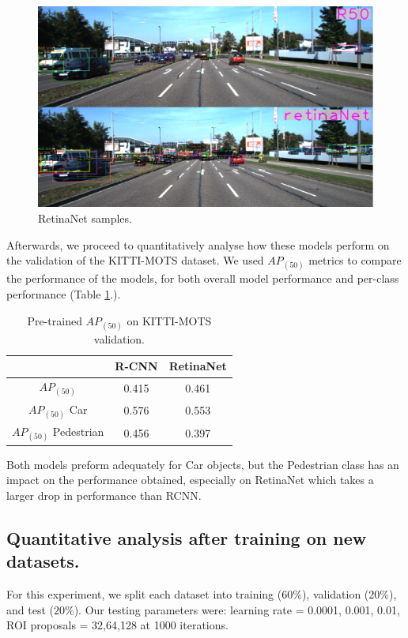 \documentclass[11pt,a4paper,twocolumn,twoside]{article}
\begin{document}
\begin{figure}[ht]
    \centering
    \includegraphics[width=0.8\linewidth]{Resources/Images/r50retina.png}
    \caption{RetinaNet samples.}
    \label{fig:r50retina}
    \end{figure}

Afterwards, we proceed to quantitatively analyse how these models perform on the validation of the KITTI-MOTS dataset. We used $AP_{(50)}$ metrics to compare the performance of the models, for both overall model performance and per-class performance (Table \ref{table:KITTI_Table1}.). 

\begin{table}[ht]
    \centering
    \begin{tabular}{|c || c | c|} 
        \hline
          & \textbf{R-CNN} & \textbf{RetinaNet} \\ [0.8ex] 
          \hline
         $AP_{(50)}$ & 0.415 & 0.461  \\ 
         \hline
         $AP_{(50)}$ Car & 0.576 & 0.553 \\
         \hline
         $AP_{(50)}$ Pedestrian & 0.456 & 0.397 \\
         \hline
    \end{tabular}
    \caption{\label{table:KITTI_Table1}Pre-trained $AP_{(50)}$ on KITTI-MOTS validation.}
\end{table}

Both models preform adequately for Car objects, but the Pedestrian class has an impact on the performance obtained, especially on RetinaNet which takes a larger drop in performance than RCNN.

\subsection{Quantitative analysis after training on new datasets.}

For this experiment, we split each dataset into training ($60\%$), validation ($20\%$), and test ($20\%$). Our testing parameters were: learning rate = {0.0001, 0.001, 0.01}, ROI proposals = {32,64,128} at 1000 iterations.
\end{document}
